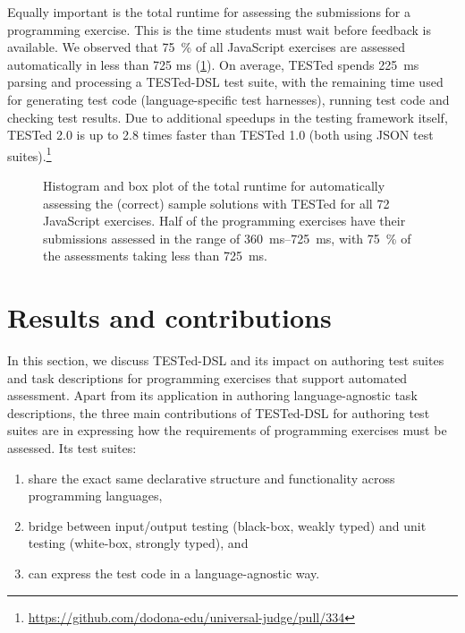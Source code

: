 \documentclass[../main]{subfiles}
\begin{document}
Equally important is the total runtime for assessing the submissions for a programming exercise.
This is the time students must wait before feedback is available.
We observed that \qty{75}{\percent} of all JavaScript exercises are assessed automatically in less than 725 ms (\cref{fig:dsl-performance}).
On average, TESTed spends \qty{225}{\milli\second} parsing and processing a TESTed-DSL test suite, with the remaining time used for generating test code (language-specific test harnesses), running test code and checking test results.
Due to additional speedups in the testing framework itself, TESTed 2.0 is up to 2.8 times faster than TESTed 1.0 (both using JSON test suites).\footnote{\url{https://github.com/dodona-edu/universal-judge/pull/334}}

\begin{figure}
    \centering
    
    \caption{
        Histogram and box plot of the total runtime for automatically assessing the (correct) sample solutions with TESTed for all \num{72} JavaScript exercises.
        Half of the programming exercises have their submissions assessed in the range of \SIrange{360}{725}{\milli\second}, with \qty{75}{\percent} of the assessments taking less than \qty{725}{\milli\second}.
    }
    \label{fig:dsl-performance}
\end{figure}

\section{Results and contributions}\label{sec:dsl-results-and-contributions}

In this section, we discuss TESTed-DSL and its impact on authoring test suites and task descriptions for programming exercises that support automated assessment.
Apart from its application in authoring language-agnostic task descriptions, the three main contributions of TESTed-DSL for authoring test suites are in expressing how the requirements of programming exercises must be assessed.
Its test suites:

\begin{enumerate}
    \item share the exact same declarative structure and functionality across programming languages,
    \item bridge between input/output testing (black-box, weakly typed) and unit testing (white-box, strongly typed), and
    \item can express the test code in a language-agnostic way.
\end{enumerate}
\end{document}
